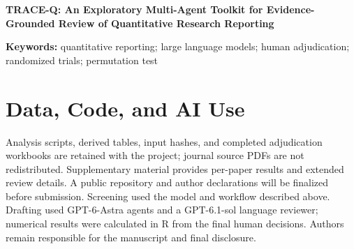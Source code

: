 \documentclass[12pt,a4paper]{article}
\begin{document}
\begin{center}
{\Large\bfseries TRACE-Q: An Exploratory Multi-Agent Toolkit for Evidence-Grounded Review of Quantitative Research Reporting\par}
\vspace{7pt}{\small Draft manuscript --- October 22, 2026}
\end{center}
\begin{abstract}
Quantitative reporting issues can be difficult to assess when evidence is spread across an article, supplements, protocols, and statistical analysis plans. We describe TRACE-Q, an exploratory multi-agent toolkit that links source mapping, quantitative checks, inclusion screening, rechecking, and audit to human adjudication. We examined workflow 1.6.2 in an availability sample of 44 randomized trial packages published in \textit{JAMA} in 2018--2019 and 2024--2025, using final human-reviewed workbooks. Of 440 candidates, 413 were retained and 27 excluded. Retention included descriptive protocol--report differences and did not imply confirmation. The principal endpoint comprised 41 confirmed or probable substantive statistical issues in report materials, occurring in 22 papers. Mean counts were 1.05 per paper in 2018--2019 and 0.84 in 2024--2025 (difference, $-0.21$; 95\% bootstrap confidence interval, $-1.02$ to 0.56; exact paper-level permutation $P=0.654$). TRACE-Q provides a structured record of concerns for human assessment. This development application did not assess missed issues, diagnostic accuracy, or efficiency. Availability sampling and a single recorded reviewer limit generalization, and the period comparison does not establish a change in reporting quality.
\end{abstract}
\noindent\textbf{Keywords:} quantitative reporting; large language models; human adjudication; randomized trials; permutation test








\section*{Data, Code, and AI Use}
Analysis scripts, derived tables, input hashes, and completed adjudication workbooks are retained with the project; journal source PDFs are not redistributed. Supplementary material provides per-paper results and extended review details. A public repository and author declarations will be finalized before submission. Screening used the model and workflow described above. Drafting used GPT-6-Astra agents and a GPT-6.1-sol language reviewer; numerical results were calculated in R from the final human decisions. Authors remain responsible for the manuscript and final disclosure.


\end{document}

